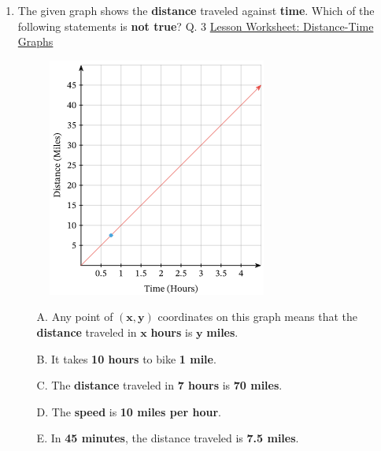 \documentclass[A4,12pt]{article}
\begin{document}
\begin{enumerate}[label=\bfseries (\arabic*)]
\item The given graph shows the \textbf{distance} traveled against \textbf{time}. Which of the following statements is \textbf{not true}? \cite{Nagwa} Q. 3 \href{https://www.nagwa.com/en/worksheets/932192593730/}{Lesson Worksheet: Distance-Time Graphs}
%
\begin{figure}[H]
    \centering
    \includegraphics[scale=0.7]{Nagwa_Q3_kin2.png}
\end{figure}
%
\begin{itemize}
    \item[A. ] Any point of $\bm{(x,y)}$ coordinates on this graph means that the \textbf{distance} traveled in $\bm x$ \textbf{hours} is $\bm y$ \textbf{miles}.
    \item[B. ] It takes \textbf{10 hours} to bike \textbf{1 mile}.
    \item[C. ] The \textbf{distance} traveled in \textbf{7 hours} is \textbf{70 miles}.
    \item[D. ] The \textbf{speed} is \textbf{10 miles per hour}.
    \item[E. ] In \textbf{45 minutes}, the distance traveled is \textbf{7.5 miles}.
\end{itemize}
%

\end{enumerate}
\end{document}
